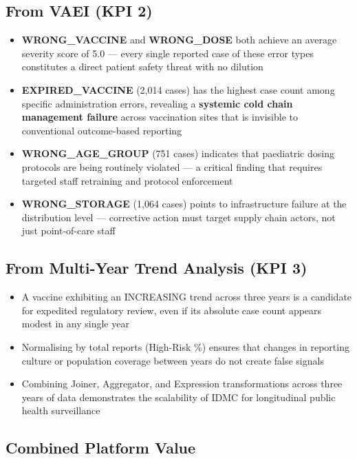 \documentclass[12pt,a4paper]{report}
\begin{document}
\subsection*{From VAEI (KPI 2)}
\begin{itemize}[leftmargin=*]
  \item \textbf{WRONG\_VACCINE} and \textbf{WRONG\_DOSE} both achieve an average severity score of 5.0 — every single reported case of these error types constitutes a direct patient safety threat with no dilution
  \item \textbf{EXPIRED\_VACCINE} (2,014 cases) has the highest case count among specific administration errors, revealing a \textbf{systemic cold chain management failure} across vaccination sites that is invisible to conventional outcome-based reporting
  \item \textbf{WRONG\_AGE\_GROUP} (751 cases) indicates that paediatric dosing protocols are being routinely violated — a critical finding that requires targeted staff retraining and protocol enforcement
  \item \textbf{WRONG\_STORAGE} (1,064 cases) points to infrastructure failure at the distribution level — corrective action must target supply chain actors, not just point-of-care staff
\end{itemize}

\subsection*{From Multi-Year Trend Analysis (KPI 3)}
\begin{itemize}[leftmargin=*]
  \item A vaccine exhibiting an INCREASING trend across three years is a candidate for expedited regulatory review, even if its absolute case count appears modest in any single year
  \item Normalising by total reports (High-Risk \%) ensures that changes in reporting culture or population coverage between years do not create false signals
  \item Combining Joiner, Aggregator, and Expression transformations across three years of data demonstrates the scalability of IDMC for longitudinal public health surveillance
\end{itemize}

\subsection*{Combined Platform Value}
\end{document}
